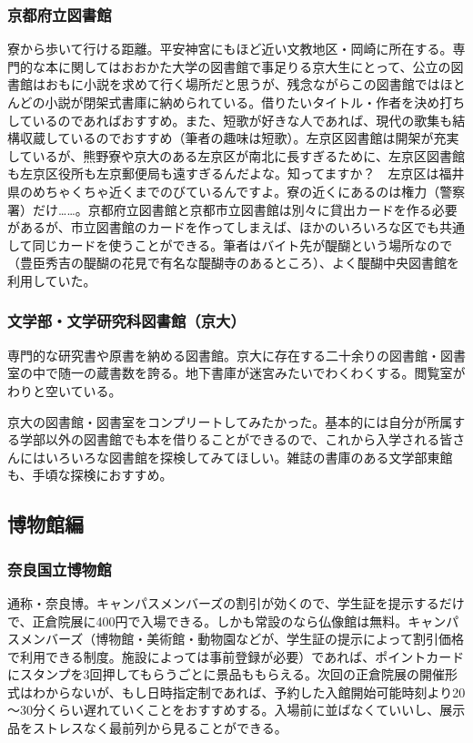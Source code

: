 \subsubsection{京都府立図書館}
寮から歩いて行ける距離。平安神宮にもほど近い文教地区・岡崎に所在する。専門的な本に関してはおおかた大学の図書館で事足りる京大生にとって、公立の図書館はおもに小説を求めて行く場所だと思うが、残念ながらこの図書館ではほとんどの小説が閉架式書庫に納められている。借りたいタイトル・作者を決め打ちしているのであればおすすめ。また、短歌が好きな人であれば、現代の歌集も結構収蔵しているのでおすすめ（筆者の趣味は短歌）。左京区図書館は開架が充実しているが、熊野寮や京大のある左京区が南北に長すぎるために、左京区図書館も左京区役所も左京郵便局も遠すぎるんだよな。知ってますか？　左京区は福井県のめちゃくちゃ近くまでのびているんですよ。寮の近くにあるのは権力（警察署）だけ……。京都府立図書館と京都市立図書館は別々に貸出カードを作る必要があるが、市立図書館のカードを作ってしまえば、ほかのいろいろな区でも共通して同じカードを使うことができる。筆者はバイト先が醍醐という場所なので（豊臣秀吉の醍醐の花見で有名な醍醐寺のあるところ）、よく醍醐中央図書館を利用していた。

\subsubsection{文学部・文学研究科図書館（京大）}
専門的な研究書や原書を納める図書館。京大に存在する二十余りの図書館・図書室の中で随一の蔵書数を誇る。地下書庫が迷宮みたいでわくわくする。閲覧室がわりと空いている。

京大の図書館・図書室をコンプリートしてみたかった。基本的には自分が所属する学部以外の図書館でも本を借りることができるので、これから入学される皆さんにはいろいろな図書館を探検してみてほしい。雑誌の書庫のある文学部東館も、手頃な探検におすすめ。

\subsection{博物館編}
\subsubsection{奈良国立博物館}
通称・奈良博。キャンパスメンバーズの割引が効くので、学生証を提示するだけで、正倉院展に400円で入場できる。しかも常設のなら仏像館は無料。キャンパスメンバーズ（博物館・美術館・動物園などが、学生証の提示によって割引価格で利用できる制度。施設によっては事前登録が必要）であれば、ポイントカードにスタンプを3回押してもらうごとに景品ももらえる。次回の正倉院展の開催形式はわからないが、もし日時指定制であれば、予約した入館開始可能時刻より20～30分くらい遅れていくことをおすすめする。入場前に並ばなくていいし、展示品をストレスなく最前列から見ることができる。


